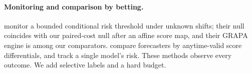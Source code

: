 \paragraph{Monitoring and comparison by betting.}
\citet{timans2025} monitor a bounded conditional risk threshold under unknown shifts; their null coincides with our paired-cost null after an affine score map, and their GRAPA
engine is among our comparators. \citet{choe2022comparing} compare forecasters by anytime-valid score differentials, and \citet{podkopaev2022tracking} track a single model's risk.
These methods observe every outcome. We add selective labels and a hard budget.

